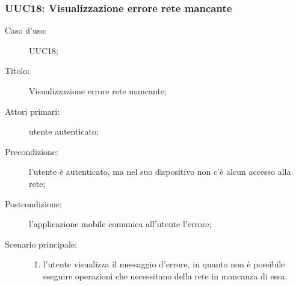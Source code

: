 \documentclass[../../../analisi-dei-requisiti.tex]{subfiles}
\begin{document}
\subsubsection{UUC18: Visualizzazione errore rete mancante}%
\label{subs:UUC18}

\begin{description}
  \item[Caso d'uso:] UUC18;
  \item[Titolo:] Visualizzazione errore rete mancante;
  \item[Attori primari:] utente autenticato;
  \item[Precondizione:] l'utente è autenticato, ma nel suo dispositivo non c'è alcun accesso alla rete;
  \item[Postcondizione:] l'applicazione mobile comunica all'utente l'errore;
  \item[Scenario principale:]
        \begin{enumerate}
          \item l'utente visualizza il messaggio d'errore, in quanto non è possibile eseguire operazioni che necessitano della rete in mancanza di essa.
        \end{enumerate}
\end{description}
\end{document}
